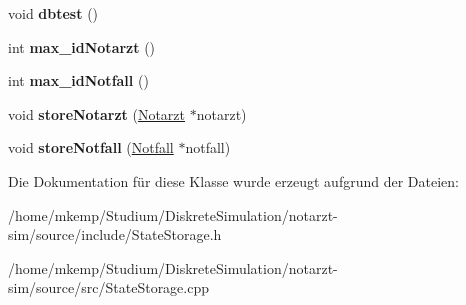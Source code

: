 \begin{DoxyCompactItemize}
\item 
void {\bfseries dbtest} ()\hypertarget{classStateStorage_a525c4f4980167fa63dc99e446a825997}{}\label{classStateStorage_a525c4f4980167fa63dc99e446a825997}

\item 
int {\bfseries max\+\_\+id\+Notarzt} ()\hypertarget{classStateStorage_a03a24b950d224309b64296757cea35c6}{}\label{classStateStorage_a03a24b950d224309b64296757cea35c6}

\item 
int {\bfseries max\+\_\+id\+Notfall} ()\hypertarget{classStateStorage_a31d513563b819d071973c2642e3bd16c}{}\label{classStateStorage_a31d513563b819d071973c2642e3bd16c}

\item 
void {\bfseries store\+Notarzt} (\hyperlink{classNotarzt}{Notarzt} $\ast$notarzt)\hypertarget{classStateStorage_ab8ccffed3ef96b3d2be675785b1939e6}{}\label{classStateStorage_ab8ccffed3ef96b3d2be675785b1939e6}

\item 
void {\bfseries store\+Notfall} (\hyperlink{classNotfall}{Notfall} $\ast$notfall)\hypertarget{classStateStorage_af9e3ff68e3408315162dc7e52db1f938}{}\label{classStateStorage_af9e3ff68e3408315162dc7e52db1f938}

\end{DoxyCompactItemize}


Die Dokumentation für diese Klasse wurde erzeugt aufgrund der Dateien\+:\begin{DoxyCompactItemize}
\item 
/home/mkemp/\+Studium/\+Diskrete\+Simulation/notarzt-\/sim/source/include/State\+Storage.\+h\item 
/home/mkemp/\+Studium/\+Diskrete\+Simulation/notarzt-\/sim/source/src/State\+Storage.\+cpp\end{DoxyCompactItemize}
